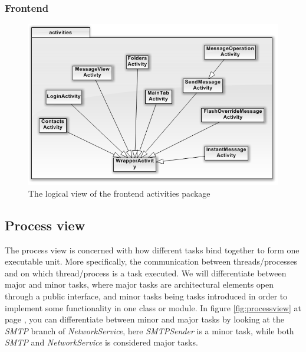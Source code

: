 \subsubsection{Frontend}
	\begin{figure}[H]
		\includegraphics[width=\textwidth]{FrontendClasses.png}
		\caption{The logical view of the frontend activities package}
		\label{fig:logicalfrontpackview}
	\end{figure}	
	
\subsection{Process view}
The process view is concerned with how different tasks bind together to form one executable unit. More specifically, the communication between threads/processes and on which thread/process is a task executed. We will differentiate between major and minor tasks, where major tasks are architectural elements open through a public interface, and minor tasks being tasks introduced in order to implement some functionality in one class or module.
In figure \ref{fig:processview} at page \pageref{fig:processview}, you can differentiate between minor and major tasks by looking at the \textit{SMTP} branch of \textit{NetworkService}, here \textit{SMTPSender} is a minor task, while both \textit{SMTP} and \textit{NetworkService} is considered major tasks. 

